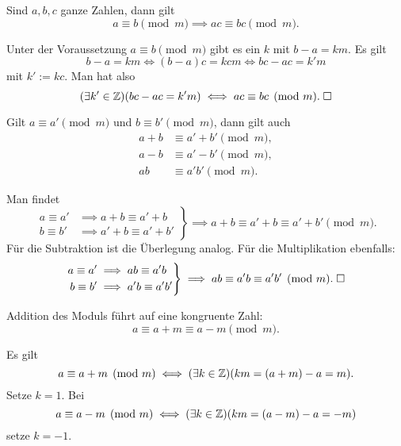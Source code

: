 \newpage
\begin{Satz}
Sind $a,b,c$ ganze Zahlen, dann gilt
\[a\equiv b\pmod{m} \implies ac\equiv bc\pmod{m}.\]
\end{Satz}
Unter der Voraussetzung $a\equiv b\pmod{m}$ gibt es ein
$k$ mit $b-a=km$. Es gilt
\[b-a=km\iff (b-a)c=kcm \iff bc-ac=k'm\]
mit $k':=kc$. Man hat also
\[(\exists k'\in\mathbb Z)(bc-ac=k'm)\iff ac\equiv bc\pmod{m}.\;\Box\]

\begin{Satz}
Gilt $a\equiv a'\pmod{m}$ und
$b\equiv b'\pmod{m}$, dann gilt auch
\begin{align*}
a+b&\equiv a'+b'\pmod{m},\\
a-b&\equiv a'-b'\pmod{m},\\
ab&\equiv a'b'\pmod{m}.
\end{align*}
\end{Satz}
 Man findet
\begin{equation}
\left.\begin{aligned}
a\equiv a'&\implies a+b\equiv a'+b\\
b\equiv b'&\implies a'+b\equiv a'+b'
\end{aligned}\right\}
\implies a+b\equiv a'+b\equiv a'+b'\pmod{m}.
\end{equation}
Für die Subtraktion ist die Überlegung analog. Für die Multiplikation
ebenfalls:%
\begin{equation}
\left.\begin{aligned}
a\equiv a'&\implies ab\equiv a'b\\
b\equiv b'&\implies a'b\equiv a'b'
\end{aligned}\right\}
\implies ab\equiv a'b\equiv a'b'\pmod{m}.\;\Box
\end{equation}

\begin{Satz}
Addition des Moduls führt auf eine kongruente Zahl:%
\[a\equiv a+m\equiv a-m\pmod{m}.\]
\end{Satz}
Es gilt
\[a\equiv a+m\pmod{m}\iff (\exists k\in\mathbb Z)(km=(a+m)-a=m).\]
Setze $k=1$. Bei
\[a\equiv a-m\pmod{m}\iff (\exists k\in\mathbb Z)(km=(a-m)-a=-m)\]
setze $k=-1$.\;\qedsymbol
